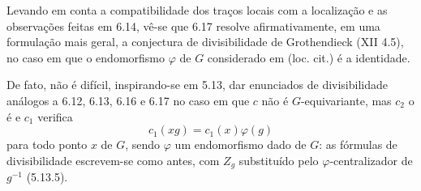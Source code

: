 Levando em conta a compatibilidade dos traços locais com a localização e as observações feitas em 6.14, vê-se que 6.17 resolve afirmativamente, em uma formulação mais geral, a conjectura de divisibilidade de Grothendieck (XII 4.5), no caso em que o endomorfismo $\varphi$ de $G$ considerado em (loc. cit.) é a identidade.

De fato, não é difícil, inspirando-se em 5.13, dar enunciados de divisibilidade análogos a 6.12, 6.13, 6.16 e 6.17 no caso em que $c$ não é $G$-equivariante, mas $c_2$ o é e $c_1$ verifica
\[
c_1(xg)=c_1(x)\varphi(g)
\]
para todo ponto $x$ de $G$, sendo $\varphi$ um endomorfismo dado de $G$: as fórmulas de divisibilidade escrevem-se como antes, com $Z_g$ substituído pelo $\varphi$-centralizador de $g^{-1}$ (5.13.5).
